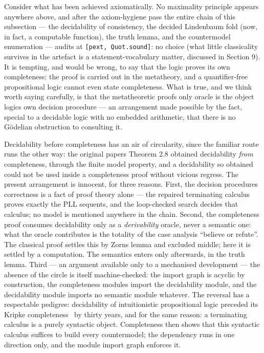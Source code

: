 Consider what has been achieved axiomatically. No maximality
principle appears anywhere above, and after the axiom-hygiene pass the
entire chain of this subsection --- the decidability of consistency, the
decided Lindenbaum fold (now, in fact, a computable function), the
truth lemma, and the countermodel enumeration --- audits at
\texttt{[pext, Quot.sound]}: no choice (what little classicality
survives in the artefact is a statement-vocabulary matter, discussed
in Section 9). It is tempting, and would be wrong, to say that the
logic proves its own completeness: the proof
is carried out in the metatheory, and a quantifier-free propositional logic
cannot even state completeness. What is true, and we think worth
saying carefully, is that the metatheoretic proof\textquotesingle s only oracle is the
object logic\textquotesingle s own decision procedure --- an arrangement made possible by
the fact, special to a decidable logic with no embedded arithmetic,
that there is no Gödelian obstruction to consulting it.

\begin{remark}\label{rem:circle}
Decidability before completeness has an air of circularity, since the
familiar route runs the other way: the original paper\textquotesingle s Theorem 2.8
obtained decidability \emph{from} completeness, through the finite
model property, and a decidability so obtained could not be used inside
a completeness proof without vicious regress. The present arrangement
is innocent, for three reasons. First, the decision procedure\textquotesingle s
correctness is a fact of proof theory alone --- the repaired
terminating calculus proves exactly the PLL sequents, and the
loop-checked search decides that calculus; no model is mentioned
anywhere in the chain. Second, the completeness proof consumes
decidability only as a \emph{derivability} oracle, never a semantic
one: what the oracle contributes is the totality of the case analysis
``believe or refute''. The classical proof settles this by Zorn\textquotesingle s lemma and
excluded middle; here it is settled by a computation. The semantics enters
only afterwards, in the truth lemma. Third --- an argument available
only to a mechanised development --- the absence of the circle is
itself machine-checked: the import graph is acyclic by construction,
the completeness modules import the decidability module, and the
decidability module imports no semantic module whatever. The reversal
has a respectable pedigree: decidability of intuitionistic
propositional logic \cite{Gentzen1935} preceded its Kripke
completeness~\cite{Kripke1965} by thirty years, and for the same
reason: a terminating calculus is a purely syntactic object.
Completeness then shows that this syntactic calculus suffices
to build every countermodel; the dependency runs in one direction only, and the
module import graph enforces it.
\end{remark}


